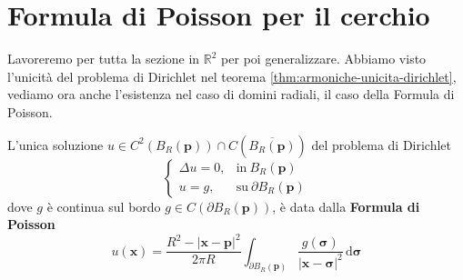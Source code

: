 \documentclass[10pt,a4paper,twoside,openright]{book}
\newcommand{\x}{\mathbf{x}}
\newcommand{\sigg}{\bm{\sigma}}
\newcommand{\de}{\,\mathrm d}
\newcommand{\dsig}{\de \sigg}
\begin{document}
\section{Formula di Poisson per il cerchio}
Lavoreremo per tutta la sezione in $\displaystyle \mathbb{R}^{2}$ per poi generalizzare.
Abbiamo visto l'unicità del problema di Dirichlet nel teorema \ref{thm:armoniche-unicita-dirichlet}, vediamo ora anche l'esistenza nel caso di domini radiali, il caso della Formula di Poisson.
\begin{theorem}
    L'unica soluzione $u\in C^{2}(B_{R}(\mathbf{p})) \cap C\left(\overline{B_{R}(\mathbf{p})}\right)$ del problema di Dirichlet
    \begin{equation*}
        \begin{cases}
            \Delta u=0, & \text{in} \ B_{R}(\mathbf{p})          \\
            u=g,        & \text{su} \ \partial B_{R}(\mathbf{p})
        \end{cases}
    \end{equation*}
    dove $g$ è continua sul bordo $g\in C(\partial B_{R}(\mathbf{p}))$, è data dalla \textbf{Formula di Poisson}
    \begin{equation}
        \label{eq:poisson-cerchio}
        u(\x) =\frac{R^{2} -| \x-\mathbf{p}| ^{2}}{2\pi R}\int _{\partial B_{R}(\mathbf{p})}\frac{g(\sigg)}{| \x-\sigg | ^{2}} \dsig
    \end{equation}
\end{theorem}
\end{document}
